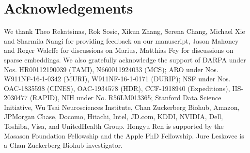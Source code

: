 \documentclass{article}
\begin{document}
\section*{Acknowledgements}
We thank Theo Rekatsinas, Rok Sosic, Xikun Zhang, Serena Chang, Michael Xie and Sharmila Nangi for providing feedback on our manuscript, Jason Mahoney and Roger Waleffe for discussions on Marius, Matthias Fey for discussions on sparse embeddings.
We also gratefully acknowledge the support of 
DARPA under Nos. HR00112190039 (TAMI), N660011924033 (MCS);
ARO under Nos. W911NF-16-1-0342 (MURI), W911NF-16-1-0171 (DURIP);
NSF under Nos. OAC-1835598 (CINES), OAC-1934578 (HDR), CCF-1918940 (Expeditions), IIS-2030477 (RAPID),
NIH under No. R56LM013365;
Stanford Data Science Initiative, 
Wu Tsai Neurosciences Institute,
Chan Zuckerberg Biohub,
Amazon, JPMorgan Chase, Docomo, Hitachi, Intel, JD.com, KDDI, NVIDIA, Dell, Toshiba, Visa, and UnitedHealth Group. 
Hongyu Ren is supported by the Masason Foundation Fellowship and the Apple PhD Fellowship.
Jure Leskovec is a Chan Zuckerberg Biohub investigator.




\end{document}
